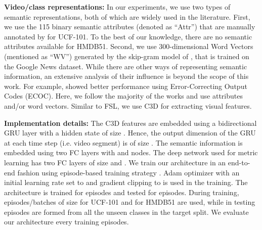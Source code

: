 \textbf{Video/class representations:} In our experiments, we use two types of semantic representations, both of which are widely used in the literature. First, we use the 115 binary semantic attributes (denoted as ``Attr'') that are manually annotated by \cite{THUMOS14} for UCF-101. To the best of our knowledge, there are no semantic attributes available for HMDB51. Second, we use 300-dimensional Word Vectors (mentioned as ``WV'') generated by the skip-gram model of \cite{mikolov2013distributed}, that is trained on the Google News dataset. While there are other ways of representing semantic information, an extensive analysis of their influence is beyond the scope of this work. For example, \cite{qin2017zero} showed better performance using Error-Correcting Output Codes (ECOC). Here, we follow the majority of the works and use attributes and/or word vectors. Similar to FSL, we use C3D for extracting visual features.



\textbf{Implementation details:} The C3D features are embedded using a bidirectional GRU layer with a hidden state of size . Hence, the output dimension of the GRU at each time step (i.e. video segment) is of size . The semantic information is embedded using two FC layers with  and  nodes. The deep network used for metric learning has two FC layers of size  and . We train our architecture in an end-to-end fashion using episode-based training strategy \cite{vinyals_16_oneshot, snell_17_prototypical}. Adam optimizer \cite{kingma2014adam} with an initial learning rate set to  and gradient clipping to  is used in the training. The architecture is trained for  episodes and tested for  episodes. During training, episodes/batches of size  for UCF-101 and  for HMDB51 are used, while in testing episodes are formed from all the unseen classes in the target split. We evaluate our architecture every  training episodes.



